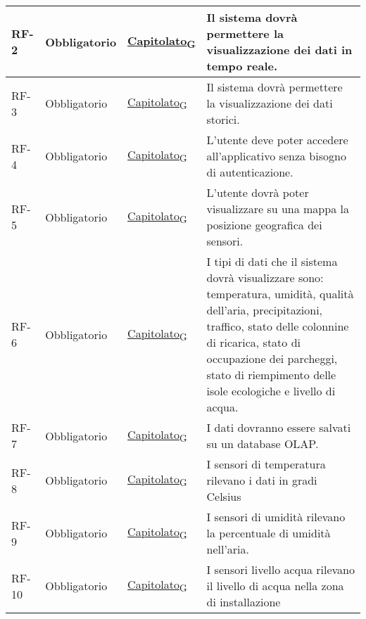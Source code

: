 \begin{longtable}{|>{\centering\arraybackslash}m{}|>{\centering\arraybackslash}m{}|>{\centering\arraybackslash}m{}|>{\centering\arraybackslash}m{}|}
	\\\hline
	RF-2            & Obbligatorio        & \href{https://7last.github.io/docs/pb/documentazione-interna/glossario\#capitolato}{Capitolato\textsubscript{G}} & Il sistema dovrà permettere la visualizzazione dei dati in tempo reale.
	\\\hline
	RF-3            & Obbligatorio        & \href{https://7last.github.io/docs/pb/documentazione-interna/glossario\#capitolato}{Capitolato\textsubscript{G}} & Il sistema dovrà permettere la visualizzazione dei dati storici.
	\\\hline
	RF-4            & Obbligatorio        & \href{https://7last.github.io/docs/pb/documentazione-interna/glossario\#capitolato}{Capitolato\textsubscript{G}} & L'utente deve poter accedere all'applicativo senza bisogno di autenticazione.
	\\\hline
	RF-5            & Obbligatorio        & \href{https://7last.github.io/docs/pb/documentazione-interna/glossario\#capitolato}{Capitolato\textsubscript{G}} & L'utente dovrà poter visualizzare su una mappa la posizione geografica dei sensori.
	\\\hline
	RF-6            & Obbligatorio        & \href{https://7last.github.io/docs/pb/documentazione-interna/glossario\#capitolato}{Capitolato\textsubscript{G}} & I tipi di dati che il sistema dovrà visualizzare sono: temperatura, umidità, qualità dell'aria, precipitazioni, traffico, stato delle colonnine di ricarica, stato di occupazione dei parcheggi, stato di riempimento delle isole ecologiche e livello di acqua.
	\\\hline
	RF-7            & Obbligatorio        & \href{https://7last.github.io/docs/pb/documentazione-interna/glossario\#capitolato}{Capitolato\textsubscript{G}} & I dati dovranno essere salvati su un database OLAP.
	\\\hline
	RF-8            & Obbligatorio        & \href{https://7last.github.io/docs/pb/documentazione-interna/glossario\#capitolato}{Capitolato\textsubscript{G}} & I sensori di temperatura rilevano i dati in gradi Celsius
	\\\hline
	RF-9            & Obbligatorio        & \href{https://7last.github.io/docs/pb/documentazione-interna/glossario\#capitolato}{Capitolato\textsubscript{G}} & I sensori di umidità rilevano la percentuale di umidità nell’aria.
	\\\hline
	RF-10           & Obbligatorio        & \href{https://7last.github.io/docs/pb/documentazione-interna/glossario\#capitolato}{Capitolato\textsubscript{G}} & I sensori livello acqua rilevano il livello di acqua nella zona di installazione

\end{longtable}
